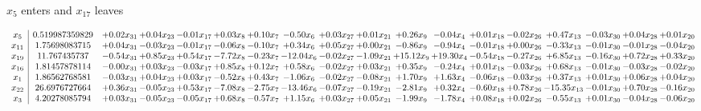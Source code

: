 \documentclass[9pt]{article}
\begin{document}
 $ x_{5} $ enters and $ x_{17} $ leaves 

 \[\begin{array}{c| c c@{\hskip 2pt} c@{\hskip 2pt} c@{\hskip 2pt} c@{\hskip 2pt} c@{\hskip 2pt} c@{\hskip 2pt} c@{\hskip 2pt} c@{\hskip 2pt} c@{\hskip 2pt} c@{\hskip 2pt} c@{\hskip 2pt} c@{\hskip 2pt} c@{\hskip 2pt} c@{\hskip 2pt} c@{\hskip 2pt} c@{\hskip 2pt} }
 x_{5}   &  0.519987359829 & +  0.02 x_{31} & +  0.04 x_{23} & -0.01 x_{17} & +  0.03 x_{8} & +  0.10 x_{7} & -0.50 x_{6} & +  0.03 x_{27} & +  0.01 x_{21} & +  0.26 x_{9} & -0.04 x_{4} & +  0.01 x_{18} & -0.02 x_{26} & +  0.47 x_{13} & -0.03 x_{30} & +  0.04 x_{28} & +  0.01 x_{20}\\
 x_{11}   &  1.75698083715 & +  0.04 x_{31} & -0.03 x_{23} & -0.01 x_{17} & -0.06 x_{8} & -0.10 x_{7} & +  0.34 x_{6} & +  0.05 x_{27} & +  0.00 x_{21} & -0.86 x_{9} & -0.94 x_{4} & -0.01 x_{18} & +  0.00 x_{26} & -0.33 x_{13} & -0.01 x_{30} & -0.01 x_{28} & -0.04 x_{20}\\
 x_{19}   &  11.767435737 & -0.54 x_{31} & +  0.85 x_{23} & +  0.54 x_{17} & -7.72 x_{8} & -0.23 x_{7} & -12.04 x_{6} & -0.02 x_{27} & -1.09 x_{21} & + 15.12 x_{9} & + 19.30 x_{4} & -0.54 x_{18} & -0.27 x_{26} & +  6.85 x_{13} & -0.16 x_{30} & +  0.72 x_{28} & +  0.33 x_{20}\\
 x_{16}   &  1.81457878114 & -0.00 x_{31} & +  0.03 x_{23} & -0.03 x_{17} & +  0.85 x_{8} & +  0.12 x_{7} & +  0.58 x_{6} & -0.02 x_{27} & +  0.03 x_{21} & +  0.35 x_{9} & -0.24 x_{4} & +  0.01 x_{18} & -0.03 x_{26} & +  0.68 x_{13} & -0.01 x_{30} & -0.03 x_{28} & -0.02 x_{20}\\
 x_{1}   &  1.86562768581 & -0.03 x_{31} & +  0.04 x_{23} & +  0.03 x_{17} & -0.52 x_{8} & +  0.43 x_{7} & -1.06 x_{6} & -0.02 x_{27} & -0.08 x_{21} & +  1.70 x_{9} & +  1.63 x_{4} & -0.06 x_{18} & -0.03 x_{26} & +  0.37 x_{13} & +  0.01 x_{30} & +  0.06 x_{28} & +  0.04 x_{20}\\
 x_{22}   &  26.6976727664 & +  0.36 x_{31} & -0.05 x_{23} & +  0.53 x_{17} & -7.08 x_{8} & -2.75 x_{7} & -13.46 x_{6} & -0.07 x_{27} & -0.19 x_{21} & -2.81 x_{9} & +  0.32 x_{4} & -0.60 x_{18} & +  0.78 x_{26} & -15.35 x_{13} & -0.01 x_{30} & +  0.70 x_{28} & -0.16 x_{20}\\
 x_{3}   &  4.20278085794 & +  0.03 x_{31} & -0.05 x_{23} & -0.05 x_{17} & +  0.68 x_{8} & -0.57 x_{7} & +  1.15 x_{6} & +  0.03 x_{27} & +  0.05 x_{21} & -1.99 x_{9} & -1.78 x_{4} & +  0.08 x_{18} & +  0.02 x_{26} & -0.55 x_{13} & +  0.01 x_{30} & -0.04 x_{28} & -0.06 x_{20}\\

\end{array}\]
\end{document}
